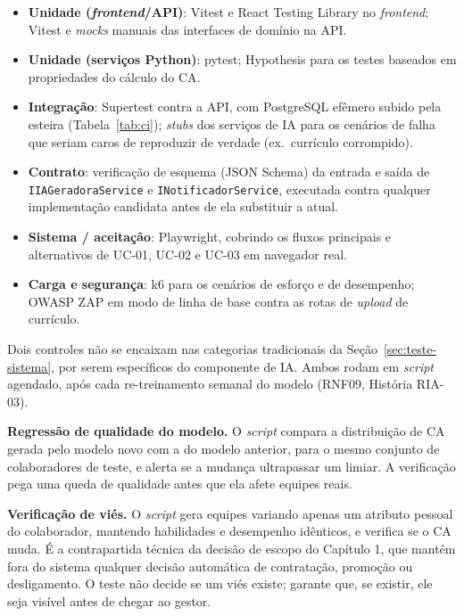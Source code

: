 \documentclass[a4paper,12pt,oneside,openany]{book}
\begin{document}
\begin{itemize}[nosep]
    \item \textbf{Unidade (\textit{frontend}/API)}: Vitest e React Testing
    Library no \textit{frontend}; Vitest e \textit{mocks} manuais das
    interfaces de domínio na API.
    \item \textbf{Unidade (serviços Python)}: pytest; Hypothesis para os
    testes baseados em propriedades do cálculo do CA.
    \item \textbf{Integração}: Supertest contra a API, com PostgreSQL
    efêmero subido pela esteira (Tabela~\ref{tab:ci}); \textit{stubs} dos
    serviços de IA para os cenários de falha que seriam caros de reproduzir
    de verdade (ex.\ currículo corrompido).
    \item \textbf{Contrato}: verificação de esquema (JSON Schema) da entrada
    e saída de \texttt{IIAGeradoraService} e \texttt{INotificadorService},
    executada contra qualquer implementação candidata antes de ela
    substituir a atual.
    \item \textbf{Sistema / aceitação}: Playwright, cobrindo os fluxos
    principais e alternativos de UC-01, UC-02 e UC-03 em navegador real.
    \item \textbf{Carga e segurança}: k6 para os cenários de esforço e de
    desempenho; OWASP ZAP em modo de linha de base contra as rotas de
    \textit{upload} de currículo.
\end{itemize}

Dois controles não se encaixam nas categorias tradicionais da
Seção~\ref{sec:teste-sistema}, por serem específicos do componente de IA. Ambos
rodam em \textit{script} agendado, após cada re-treinamento semanal do modelo
(RNF09, História RIA-03).

\textbf{Regressão de qualidade do modelo.} O \textit{script} compara a
distribuição de CA gerada pelo modelo novo com a do modelo anterior, para o
mesmo conjunto de colaboradores de teste, e alerta se a mudança ultrapassar um
limiar. A verificação pega uma queda de qualidade antes que ela afete equipes
reais.

\textbf{Verificação de viés.} O \textit{script} gera equipes variando apenas um
atributo pessoal do colaborador, mantendo habilidades e desempenho idênticos, e
verifica se o CA muda. É a contrapartida técnica da decisão de escopo do
Capítulo 1, que mantém fora do sistema qualquer decisão automática de
contratação, promoção ou desligamento. O teste não decide se um viés existe;
garante que, se existir, ele seja visível antes de chegar ao gestor.
\end{document}
